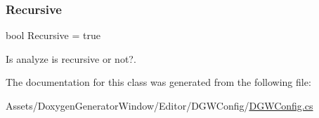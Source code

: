 \subsubsection{\texorpdfstring{Recursive}{Recursive}}
{\footnotesize\ttfamily bool Recursive = true}



Is analyze is recursive or not?. 



The documentation for this class was generated from the following file\+:\begin{DoxyCompactItemize}
\item 
Assets/\+Doxygen\+Generator\+Window/\+Editor/\+D\+G\+W\+Config/\hyperlink{DGWConfig_8cs}{D\+G\+W\+Config.\+cs}\end{DoxyCompactItemize}

